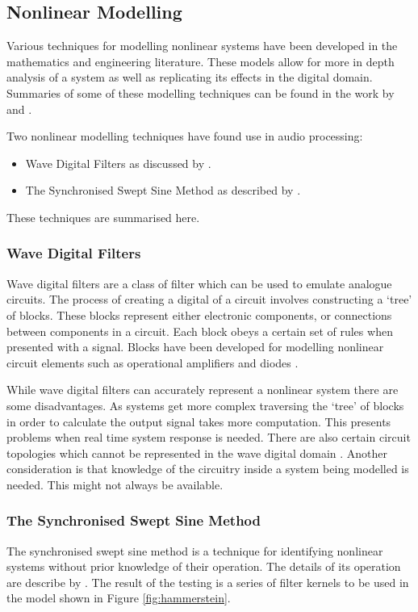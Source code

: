 		\subsection{Nonlinear Modelling}
		Various techniques for modelling nonlinear systems have been developed in the mathematics and engineering
		literature. These models allow for more in depth analysis of a system as well as replicating its effects in
		the digital domain. Summaries of some of these modelling techniques can be found in the work by
		\citet{janczak2005identification} and \citet{ogunfunmi2007adaptive}.

		Two nonlinear modelling techniques have found use in audio processing:

		\begin{itemize}
			\item Wave Digital Filters as discussed by \citet{fettweis1986wave}.
			\item The Synchronised Swept Sine Method as described by \citet{novak2010nonlinear}.
		\end{itemize}

		These techniques are summarised here.

		\subsubsection{Wave Digital Filters}
			Wave digital filters are a class of filter which can be used to emulate analogue circuits. The
			process of creating a digital of a circuit involves constructing a `tree' of blocks. These blocks
			represent either electronic components, or connections between components in a circuit. Each block
			obeys a certain set of rules when presented with a signal. Blocks have been developed for modelling
			nonlinear circuit elements such as operational amplifiers and diodes \citep{paiva2012emulation}.

			While wave digital filters can accurately represent a nonlinear system there are some disadvantages.
			As systems get more complex traversing the `tree' of blocks in order to calculate the output signal
			takes more computation. This presents problems when real time system response is needed. There are
			also certain circuit topologies which cannot be represented in the wave digital domain
			\citep{valimaki2011virtual}. Another consideration is that knowledge of the circuitry inside a
			system being modelled is needed. This might not always be available.

		\subsubsection{The Synchronised Swept Sine Method}
			The synchronised swept sine method is a technique for identifying nonlinear systems without prior
			knowledge of their operation. The details of its operation are describe by
			\citet{novak2010nonlinear}. The result of the testing is a series of filter kernels to be used in
			the model shown in Figure \ref{fig:hammerstein}.

